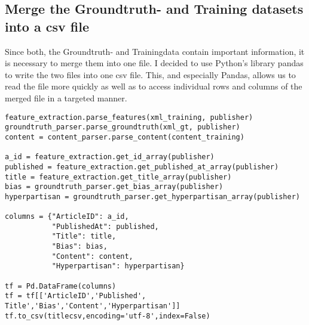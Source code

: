 \documentclass[a4paper, 11pt,titlepage,oneside,openany]{book}
\begin{document}
\subsection{Merge the Groundtruth- and Training datasets into a csv file}
Since both, the Groundtruth- and Trainingdata contain important information, it is necessary to merge them into one file. I decided to use Python's library pandas to write the two files into one csv file. This, and especially Pandas, allows us to read the file more quickly as well as to access individual rows and columns of the merged file in a targeted manner.\\
\noindent
\begin{minipage}{\linewidth}
\begin{lstlisting}[frame=single]
feature_extraction.parse_features(xml_training, publisher)
groundtruth_parser.parse_groundtruth(xml_gt, publisher)
content = content_parser.parse_content(content_training)

a_id = feature_extraction.get_id_array(publisher)
published = feature_extraction.get_published_at_array(publisher)
title = feature_extraction.get_title_array(publisher)
bias = groundtruth_parser.get_bias_array(publisher)
hyperpartisan = groundtruth_parser.get_hyperpartisan_array(publisher)

columns = {"ArticleID": a_id,
           "PublishedAt": published,
           "Title": title,
           "Bias": bias,
           "Content": content,
           "Hyperpartisan": hyperpartisan}

tf = Pd.DataFrame(columns)
tf = tf[['ArticleID','Published', Title','Bias','Content','Hyperpartisan']]
tf.to_csv(titlecsv,encoding='utf-8',index=False)
\end{lstlisting}
\end{minipage}
\end{document}
